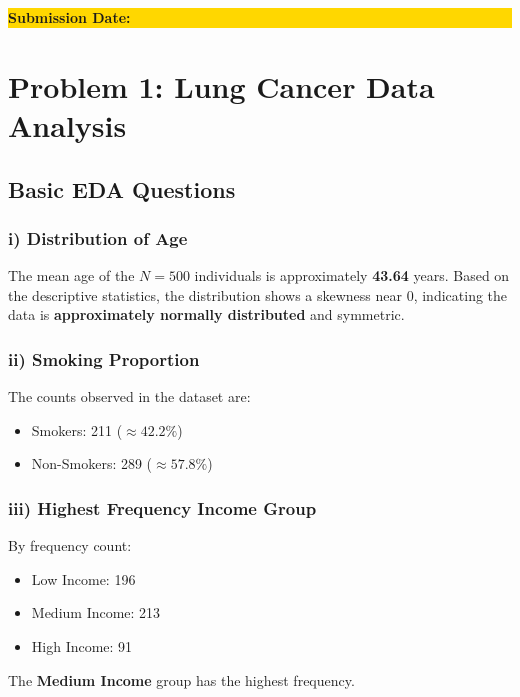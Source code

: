 \documentclass[12pt]{article}
\begin{document}
\begin{titlepage}
\begin{center}
\vfill

\colorbox{gold}{
\parbox{0.7\textwidth}{
\centering
\vspace{0.3cm}
{\Large \textbf{Submission Date: \tomoroww}}
\vspace{0.3cm}
}}

\vspace{0.8cm}



\end{center}

\end{titlepage}

\pagecolor{white}


\newpage
\tableofcontents
\newpage




\section{Problem 1: Lung Cancer Data Analysis}

\subsection{Basic EDA Questions}

\subsubsection{i) Distribution of Age}
The mean age of the $N=500$ individuals is approximately \textbf{43.64} years. Based on the descriptive statistics, the distribution shows a skewness near 0, indicating the data is \textbf{approximately normally distributed} and symmetric.

\subsubsection{ii) Smoking Proportion}
The counts observed in the dataset are:
\begin{itemize}
    \item Smokers: 211 ($\approx 42.2\%$)
    \item Non-Smokers: 289 ($\approx 57.8\%$)
\end{itemize}

\subsubsection{iii) Highest Frequency Income Group}
By frequency count:
\begin{itemize}
    \item Low Income: 196
    \item Medium Income: 213
    \item High Income: 91
\end{itemize}
The \textbf{Medium Income} group has the highest frequency.
\end{document}

